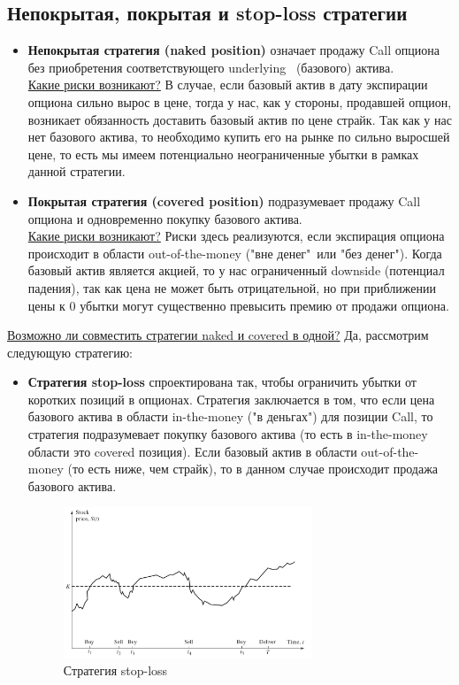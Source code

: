 \documentclass{article}
\begin{document}
 \subsection{Непокрытая, покрытая и stop-loss стратегии}
 \begin{itemize}
     \item \textbf{Непокрытая стратегия (naked position)} означает продажу Call опциона без приобретения соответствующего underlying \ (базового) актива. \\
     \underline{Какие риски возникают?} В случае, если базовый актив в дату экспирации опциона сильно вырос в цене, тогда у нас, как у стороны, продавшей опцион, возникает обязанность доставить базовый актив по цене страйк. Так как у нас нет базового актива, то необходимо купить его на рынке по сильно выросшей цене, то есть мы имеем потенциально неограниченные убытки в рамках данной стратегии. 

     \item \textbf{Покрытая стратегия (covered position)} подразумевает продажу Call опциона и одновременно покупку базового актива. \\
      \underline{Какие риски возникают?} Риски здесь реализуются, если экспирация опциона происходит в области out-of-the-money ("вне денег"\ или "без денег").  Когда базовый актив является акцией, то у нас ограниченный downside (потенциал падения), так как цена не может быть отрицательной, но при приближении цены к 0 убытки могут существенно превысить премию от продажи опциона.
    \end{itemize}

     \underline{Возможно ли совместить стратегии naked и covered в одной?} Да, рассмотрим следующую стратегию:
     	\begin{itemize}
     \item \textbf{Стратегия stop-loss} спроектирована так, чтобы ограничить убытки от коротких позиций в опционах. Стратегия заключается в том, что если цена базового актива в области in-the-money ("в деньгах") для позиции Call, то стратегия подразумевает покупку базового актива (то есть в in-the-money области это covered позиция). Если базовый актив в области out-of-the-money (то есть ниже, чем страйк), то в данном случае происходит продажа базового актива.
     
     \begin{figure}[h]
     	\centering
     	\includegraphics[width=0.7\textwidth]{Стратегия stop-loss.jpg}
     	\caption{Стратегия stop-loss}
     	\label{model}
     \end{figure}
 \end{itemize}
\end{document}
